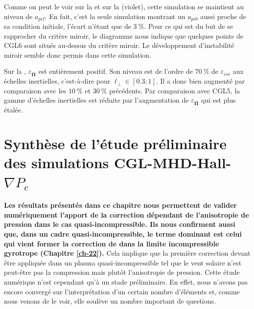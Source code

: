  Comme on peut le voir sur la  et sur la  (violet), cette simulation se maintient au niveau de $a_{piI}$. En fait, c'est la seule simulation montrant un $a_{pi0}$ aussi proche de sa condition initiale, l'écart n'étant que de $\SI{3}{\%}$. Pour ce qui est du but de se rapprocher du critère miroir, le diagramme nous indique que quelques points de CGL6 sont situés au-dessus du critère miroir. Le développement d'instabilité miroir semble donc permis dans cette simulation. 
 
 Sur la ,  $\varepsilon_{\overline{\boldsymbol{\Pi}}}$ est entièrement positif. Son niveau est de l'ordre de $\SI{70}{\%}$ de $\varepsilon_{iso}$ aux échelles inertielles, c'est-à-dire pour $\ell_{\perp} \in [\num{0.3};\num{1}]$. Il a donc bien augmenté par comparaison avec les $\SI{10}{\%}$ et $\SI{30}{\%}$ précédents. Par comparaison avec CGL5, la gamme d'échelles inertielles est réduite par l'augmentation de $\varepsilon_{\overline{\boldsymbol{\Pi}}}$ qui est plus étalée. %



\section{Synthèse de l'étude préliminaire des simulations CGL-MHD-Hall-\ensuremath{\nabla P_e}}
\label{synth-33}

{\bf Les résultats présentés dans ce chapitre nous permettent de valider numériquement l'apport de la correction dépendant de l'anisotropie de pression dans le cas quasi-incompressible. Ils nous confirment aussi que, dans un cadre quasi-incompressible, le terme dominant est celui qui vient former la correction de  dans la limite incompressible gyrotrope (Chapitre \ref{ch-22}).} Cela implique que la première correction devant être appliquée dans un plasma quasi-incompressible tel que le vent solaire n'est peut-être pas la compression mais plutôt l'anisotropie de pression. Cette étude numérique n'est cependant qu'à un stade préliminaire. En effet, nous n'avons pas encore convergé sur l'interprétation d'un certain nombre d'éléments et, comme nous venons de le voir, elle soulève un nombre important de questions.



